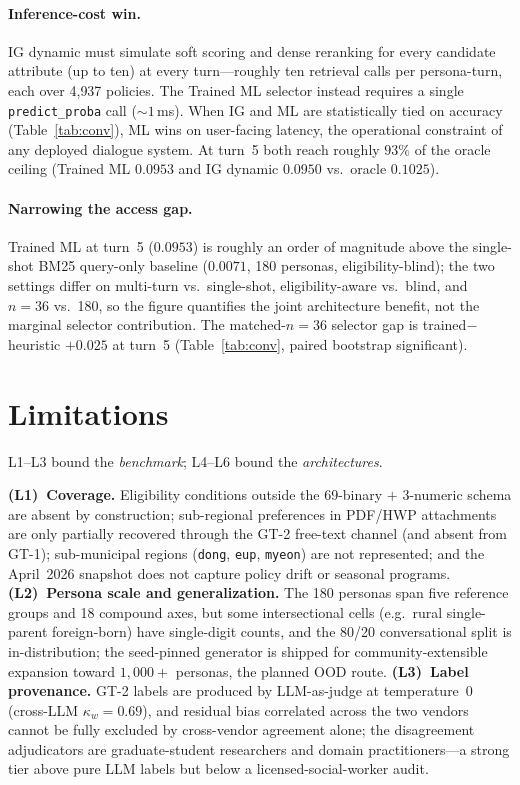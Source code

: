 \documentclass{article}
\newcommand{\npolicy}{4{,}937}
\newcommand{\npersona}{180}
\newcommand{\ndim}{69}
\begin{document}
\paragraph{Inference-cost win.}
\label{sec:conv:cost}
IG dynamic must simulate soft scoring and dense reranking for every
candidate attribute (up to ten) at every turn---roughly ten retrieval
calls per persona-turn, each over \npolicy{} policies. The Trained ML
selector instead requires a single \texttt{predict\_proba} call
($\sim{}1$\,ms). When IG and ML are statistically tied on accuracy
(Table~\ref{tab:conv}), ML wins on user-facing latency, the
operational constraint of any deployed dialogue system. At turn~5
both reach roughly $93\%$ of the oracle ceiling
(Trained ML $0.0953$ and IG dynamic $0.0950$ vs.\ oracle $0.1025$).

\paragraph{Narrowing the access gap.}
Trained ML at turn~5 ($0.0953$) is roughly an order of magnitude
above the single-shot BM25 query-only baseline ($0.0071$, 180
personas, eligibility-blind); the two settings differ on multi-turn
vs.\ single-shot, eligibility-aware vs.\ blind, and $n{=}36$ vs.\
180, so the figure quantifies the joint architecture benefit, not
the marginal selector contribution. The matched-$n{=}36$ selector
gap is trained$-$heuristic $+0.025$ at turn~5
(Table~\ref{tab:conv}, paired bootstrap
significant).

\section{Limitations}
\label{sec:limit}

L1--L3 bound the \emph{benchmark}; L4--L6 bound the
\emph{architectures}.

\textbf{(L1)~Coverage.} Eligibility conditions outside the
\ndim{}-binary $+$ 3-numeric schema are absent by construction;
sub-regional preferences in PDF/HWP attachments are only partially
recovered through the GT-2 free-text channel (and absent from GT-1);
sub-municipal regions (\texttt{dong}, \texttt{eup}, \texttt{myeon})
are not represented; and the April~2026 snapshot does not capture
policy drift or seasonal programs.
\textbf{(L2)~Persona scale and generalization.} The \npersona{}
personas span five reference groups and 18 compound axes, but some
intersectional cells (e.g.\ rural single-parent foreign-born) have
single-digit counts, and the 80/20 conversational split is
in-distribution; the seed-pinned generator is shipped for
community-extensible expansion toward $1{,}000{+}$ personas, the
planned OOD route.
\textbf{(L3)~Label provenance.} GT-2 labels are produced by
LLM-as-judge at temperature~0 (cross-LLM $\kappa_w{=}0.69$), and
residual bias correlated across the two vendors cannot be fully
excluded by cross-vendor agreement alone; the disagreement
adjudicators are graduate-student researchers and domain
practitioners---a strong tier above pure LLM labels but below a
licensed-social-worker audit.
\end{document}
